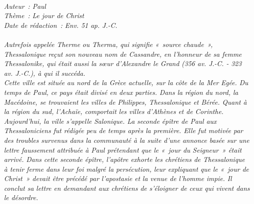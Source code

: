 \BFont
\noindent\hrulefill
{\footnotesize
\textit{
\bigskip
{\centering{}
\\Auteur~: Paul
\\Thème~: Le jour de Christ
\\Date de rédaction~: Env. 51 ap. J.-C.\\}
}
\textit{
\\Autrefois appelée Therme ou Therma, qui signifie «~source chaude~», Thessalonique reçut son nouveau nom de Cassandre, en l'honneur de sa femme Thessalonike, qui était aussi la sœur d'Alexandre le Grand (356 av. J.-C. - 323 av. J.-C.), à qui il succéda.
\\Cette ville est située au nord de la Grèce actuelle, sur la côte de la Mer Egée. Du temps de Paul, ce pays était divisé en deux parties. Dans la région du nord, la Macédoine, se trouvaient les villes de Philippes, Thessalonique et Bérée. Quant à la région du sud, l'Achaïe, comportait les villes d'Athènes et de Corinthe. Aujourd'hui, la ville s'appelle Salonique. La seconde épître de Paul aux Thessaloniciens fut rédigée peu de temps après la première. Elle fut motivée par des troubles survenus dans la communauté à la suite d'une annonce basée sur une lettre faussement attribuée à Paul prétendant que le «~jour du Seigneur~» était arrivé. Dans cette seconde épître, l'apôtre exhorte les chrétiens de Thessalonique à tenir ferme dans leur foi malgré la persécution, leur expliquant que le «~jour de Christ~» devait être précédé par l'apostasie et la venue de l'homme impie. Il conclut sa lettre en demandant aux chrétiens de s'éloigner de ceux qui vivent dans le désordre.\bigskip
}
}
\par\nobreak\noindent\hrulefill
